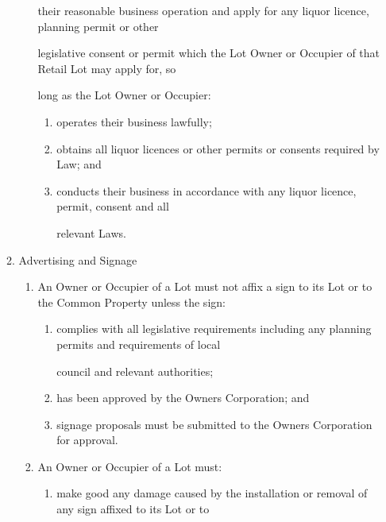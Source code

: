 \documentclass{article}
\begin{document}
\begin{enumerate}[label=\arabic*.]
\begin{enumerate}[label=\arabic{enumi}.\arabic*.]
\begin{enumerate}[label=(\arabic*)]
{\fontsize{10.02}{1}their reasonable business operation and apply for any liquor licence, planning permit or other }

{\fontsize{10.02}{1}legislative consent or permit which the Lot Owner or Occupier of that Retail Lot may apply for, so }

{\fontsize{10.02}{1}long as the Lot Owner or Occupier: }

\begin{enumerate}[label=(\alph*)]
\item {\fontsize{9.962}{1} operates their business lawfully; }

\item {\fontsize{9.962}{1} obtains all liquor licences or other permits or consents required by Law; and }

\item {\fontsize{9.962}{1} conducts their business in accordance with any liquor licence, permit, consent and all }

{\fontsize{10.02}{1}relevant Laws. }

\end{enumerate}
\end{enumerate}
\item {\fontsize{9.99}{1} Advertising and Signage }

\begin{enumerate}[label=(\arabic*)]
\item {\fontsize{9.962}{1} An Owner or Occupier of a Lot must not affix a sign to its Lot or to the Common Property unless the sign: }

\begin{enumerate}[label=(\alph*)]
\item {\fontsize{9.962}{1} complies with all legislative requirements including any planning permits and requirements of local }

{\fontsize{10.02}{1}council and relevant authorities; }

\item {\fontsize{9.962}{1} has been approved by the Owners Corporation; and }

\item {\fontsize{9.962}{1} signage proposals must be submitted to the Owners Corporation for approval. }

\end{enumerate}
\item {\fontsize{9.962}{1} An Owner or Occupier of a Lot must: }

\begin{enumerate}[label=(\alph*)]
\item {\fontsize{9.962}{1} make good any damage caused by the installation or removal of any sign affixed to its Lot or to }


\end{enumerate}
\end{enumerate}
\end{enumerate}
\end{enumerate}
\end{document}
